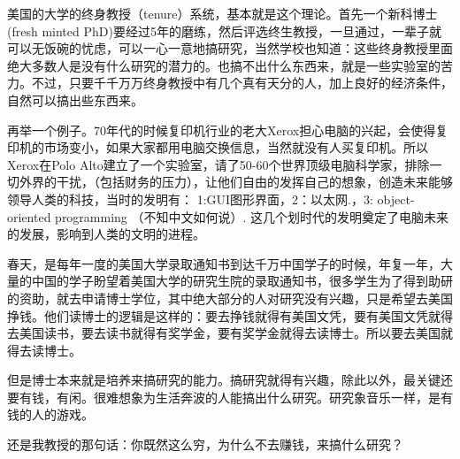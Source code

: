 美国的大学的终身教授（tenure）系统，基本就是这个理论。首先一个新科博士(fresh minted PhD)要经过5年的磨练，然后评选终生教授，一旦通过，一辈子就可以无饭碗的忧虑，可以一心一意地搞研究，当然学校也知道：这些终身教授里面绝大多数人是没有什么研究的潜力的。也搞不出什么东西来，就是一些实验室的苦力。不过，只要千千万万终身教授中有几个真有天分的人，加上良好的经济条件，自然可以搞出些东西来。

再举一个例子。70年代的时候复印机行业的老大Xerox担心电脑的兴起，会使得复印机的市场变小，如果大家都用电脑交换信息，当然就没有人买复印机。所以Xerox在Polo Alto建立了一个实验室，请了50-60个世界顶级电脑科学家，排除一切外界的干扰，（包括财务的压力），让他们自由的发挥自己的想象，创造未来能够领导人类的科技，当时的发明有：
1:GUI图形界面，2：以太网.，3: object-oriented programming （不知中文如何说）. 这几个划时代的发明奠定了电脑未来的发展，影响到人类的文明的进程。

春天，是每年一度的美国大学录取通知书到达千万中国学子的时候，年复一年，大量的中国的学子盼望着美国大学的研究生院的录取通知书，很多学生为了得到助研的资助，就去申请博士学位，其中绝大部分的人对研究没有兴趣，只是希望去美国挣钱。他们读博士的逻辑是这样的：要去挣钱就得有美国文凭，要有美国文凭就得去美国读书，要去读书就得有奖学金，要有奖学金就得去读博士。所以要去美国就得去读博士。

但是博士本来就是培养来搞研究的能力。搞研究就得有兴趣，除此以外，最关键还要有钱，有闲。很难想象为生活奔波的人能搞出什么研究。研究象音乐一样，是有钱的人的游戏。

还是我教授的那句话：你既然这么穷，为什么不去赚钱，来搞什么研究？



\clearpage